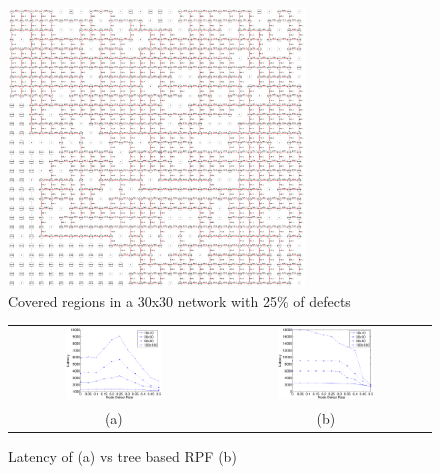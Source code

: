\begin{figure}
\centering
\includegraphics[width=0.70\textwidth]{pictures/net.ps}
\caption{Covered regions in a 30x30 network with 25\% of defects}
\label{fig:net}
\end{figure}

\begin{figure}
\centering
\begin{tabular}{cc}
\includegraphics[width=0.48\textwidth]{pictures/set2.eps} & 
\includegraphics[width=0.48\textwidth]{pictures/set2_rpf.eps} \\
(a) & (b)
\end{tabular}
\caption{Latency of \disr{} (a) vs tree based RPF (b) }
\label{fig:results_latency}
\end{figure}

